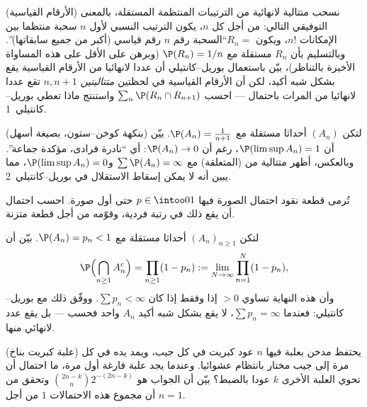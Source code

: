 \begin{exercise}[$\star\star\star$]\label{exo:b2:proba:7}
(الأرقام القياسية) نسحب متتالية لانهائية من الترتيبات المنتظمة
المستقلة، بالمعنى التوفيقي التالي: من أجل كل $n$، يكون الترتيب
النسبي لأول $n$ سحبة منتظما بين الإمكانات $n!$، ويكون
$R_n = {}$``السحبة رقم $n$ رقم قياسي (أكبر من جميع سابقاتها)''.
وبالتسليم بأن  $R_n$ مستقلة مع $\P(R_n) = 1/n$ (وبرهن على الأقل على
هذه المساواة الأخيرة بالتناظر)، بيّن باستعمال بوريل--كانتيلي أن عددا
لانهائيا من الأرقام القياسية يقع بشكل شبه أكيد، لكن أن الأرقام
القياسية في لحظتين \emph{متتاليتين} $n, n+1$ تقع عددا لانهائيا من
المرات باحتمال --- احسب $\sum_n \P(R_n \cap R_{n+1})$ واستنتج ماذا تعطي بوريل--كانتيلي~1.
\end{exercise}

\begin{exercise}[$\star\star\star$]\label{exo:b2:proba:8}
(بنكهة كوخن--ستون، بصيغة أسهل) لتكن $(A_n)$ أحداثا مستقلة مع $\P(A_n) = \frac{1}{n+1}$.
بيّن أن $\P(\limsup A_n) = 1$، رغم أن $\P(A_n) \to 0$: أي ``نادرة فرادى، مؤكدة جماعة''.
وبالعكس، أظهر متتالية من  (المتعلقة) مع $\sum\P(A_n) = \infty$ و$\P(\limsup A_n) = 0$، مما
يبين أنه لا يمكن إسقاط الاستقلال في بوريل--كانتيلي~2.
\end{exercise}

\begin{exercise}[$\star$]\label{exo:b2:proba:9}
تُرمى قطعة نقود احتمال الصورة فيها $p \in \intoo01$ حتى أول صورة. احسب احتمال
أن يقع ذلك في رتبة فردية، وقوّمه من أجل قطعة متزنة.
\end{exercise}

\begin{exercise}[$\star\star$]\label{exo:b2:proba:10}
لتكن $(A_n)_{n\geq1}$ أحداثا مستقلة مع $\P(A_n) =
p_n < 1$. بيّن أن
\[
\P\Bigl(\bigcap_{n\geq1}A_n^c\Bigr)
= \prod_{n\geq1}(1 - p_n)
:= \lim_{N\to\infty}\prod_{n=1}^N(1 - p_n),
\]
وأن هذه النهاية تساوي $> 0$ إذا وفقط إذا كان $\sum p_n <
\infty$. ووفّق ذلك مع
بوريل--كانتيلي: فعندما $\sum p_n =
\infty$، لا يقع بشكل شبه أكيد  $A_n$ واحد
فحسب --- بل يقع عدد لانهائي منها.
\end{exercise}

\begin{exercise}[$\star\star$]\label{exo:b2:proba:11}
(علبة كبريت بناخ) يحتفظ مدخن بعلبة فيها $n$ عود كبريت في كل جيب،
ويمد يده في كل مرة إلى جيب مختار بانتظام عشوائيا. وعندما يجد علبة
فارغة أول مرة، ما احتمال أن تحوي العلبة الأخرى $k$ عودا بالضبط؟
بيّن أن الجواب هو $\binom{2n-k}{n}2^{-(2n-k)}$ وتحقق من أن مجموع هذه الاحتمالات $1$
من أجل $n = 1$.
\end{exercise}

